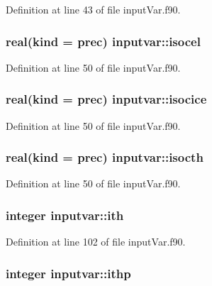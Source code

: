Definition at line 43 of file input\-Var.\-f90.

\hypertarget{classinputvar_a398c551573b9e71aaae3ba84991c6b81}{
\subsubsection[{isocel}]{\setlength{\rightskip}{0pt plus 5cm}real(kind = prec) inputvar\-::isocel}}\label{classinputvar_a398c551573b9e71aaae3ba84991c6b81}


Definition at line 50 of file input\-Var.\-f90.

\hypertarget{classinputvar_a0d3d0c4c3088dc7f9fa83b70ace2a119}{
\subsubsection[{isocice}]{\setlength{\rightskip}{0pt plus 5cm}real(kind = prec) inputvar\-::isocice}}\label{classinputvar_a0d3d0c4c3088dc7f9fa83b70ace2a119}


Definition at line 50 of file input\-Var.\-f90.

\hypertarget{classinputvar_a5f5ab91e72a9ea0ec51d7f621d01108b}{
\subsubsection[{isocth}]{\setlength{\rightskip}{0pt plus 5cm}real(kind = prec) inputvar\-::isocth}}\label{classinputvar_a5f5ab91e72a9ea0ec51d7f621d01108b}


Definition at line 50 of file input\-Var.\-f90.

\hypertarget{classinputvar_a4bba5fd8a8c399940c4b81e4da0cc9ce}{
\subsubsection[{ith}]{\setlength{\rightskip}{0pt plus 5cm}integer inputvar\-::ith}}\label{classinputvar_a4bba5fd8a8c399940c4b81e4da0cc9ce}


Definition at line 102 of file input\-Var.\-f90.

\hypertarget{classinputvar_abb9734f3e3ee40c97881bd03881065c5}{
\subsubsection[{ithp}]{\setlength{\rightskip}{0pt plus 5cm}integer inputvar\-::ithp}}\label{classinputvar_abb9734f3e3ee40c97881bd03881065c5}


